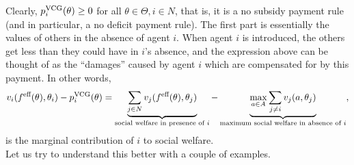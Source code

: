 		Clearly, $p_i^{\text{VCG}}(\theta) \ge 0$ for all $\theta \in \Theta,i \in N$, that is, it is a no subsidy payment rule (and in particular, a no deficit payment rule). The first part is essentially the values of others in the absence of agent $i$. When agent $i$ is introduced, the others get less than they could have in $i$'s absence, and the expression above can be thought of as the ``damages'' caused by agent $i$ which are compensated for by this payment. In other words,
		\[ v_i(f^{\text{eff}}(\theta),\theta_i) - p_i^{\text{VCG}}(\theta) = \underbrace{\sum_{j \in N} v_j(f^{\text{eff}}(\theta),\theta_j)}_{\text{social welfare in presence of $i$}} - \underbrace{\max_{a \in A} \sum_{j \ne i} v_j(a,\theta_j)}_{\text{maximum social welfare in absence of $i$}}, \]
		is the marginal contribution of $i$ to social welfare.\\
		Let us try to understand this better with a couple of examples.

